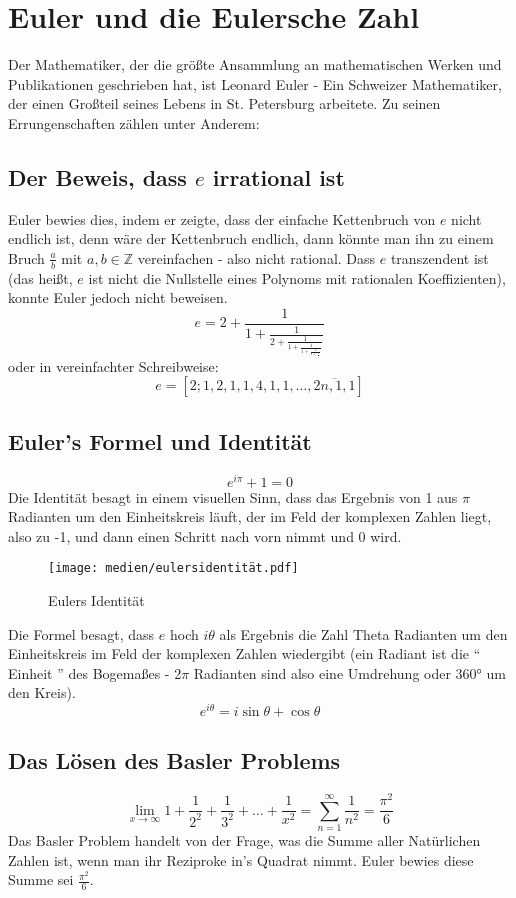 \section{Euler und die Eulersche Zahl}
Der Mathematiker, der die größte Ansammlung an mathematischen Werken und Publikationen geschrieben hat, ist Leonard Euler - Ein Schweizer Mathematiker, der einen Großteil seines Lebens in St. Petersburg arbeitete. Zu seinen Errungenschaften zählen unter Anderem: 
\subsection{Der Beweis, dass $e$ irrational ist}
Euler bewies dies, indem er zeigte, dass der einfache Kettenbruch von $e$ nicht endlich ist, denn wäre der Kettenbruch endlich, dann könnte man ihn zu einem Bruch $\frac{a}{b}$ mit $a,b \in \mathbb{Z}$ vereinfachen - also nicht rational. Dass $e$ transzendent ist (das heißt, $e$ ist nicht die Nullstelle eines Polynoms mit rationalen Koeffizienten), konnte Euler jedoch nicht beweisen. \[
e = 2 +\frac{1}{1 + \frac{1}{2 + \frac{1}{1 + \frac{1}{1 + \frac{1}{4 + \frac{1}{\ddots}}}}}} \] 
oder in vereinfachter Schreibweise: \[
e = [2; 1,2,1,1,4,1,1,\dots,\overline{2n,1,1}] \]
\subsection{Euler's Formel und Identität}
\[ e^{i\pi} + 1 = 0 \]
Die Identität besagt in einem visuellen Sinn, dass das Ergebnis von 1 aus $\pi$ Radianten um den Einheitskreis läuft, der im Feld der komplexen Zahlen liegt, also zu -1, und dann einen Schritt nach vorn nimmt und 0 wird.
\begin{figure}[h]
\texttt{[image: medien/eulersidentität.pdf]}
\centering
\caption{Eulers Identität}
\end{figure}
\newpage
\par Die Formel besagt, dass $e$ hoch $i\theta$ als Ergebnis die Zahl Theta Radianten um den Einheitskreis im Feld der komplexen Zahlen wiedergibt (ein Radiant ist die "` Einheit "' des Bogemaßes - 2$\pi$ Radianten sind also eine Umdrehung oder  360° um den Kreis).
\[ e^{i\theta} = i\sin{\theta} + \cos{\theta} \] 
\subsection{Das Lösen des Basler Problems}
 \[ \lim_{x\to\infty} 1 + \frac{1}{2^2} + \frac{1}{3^2} + \dots + \frac{1}{x^2} = \sum_{n=1}^{\infty} \frac{1}{n^2} = \frac{\pi^2}{6}\]
Das Basler Problem handelt von der Frage, was die Summe aller Natürlichen Zahlen ist, wenn man ihr Reziproke in's Quadrat nimmt. Euler bewies diese Summe sei $\frac{\pi^2}{6}$.
